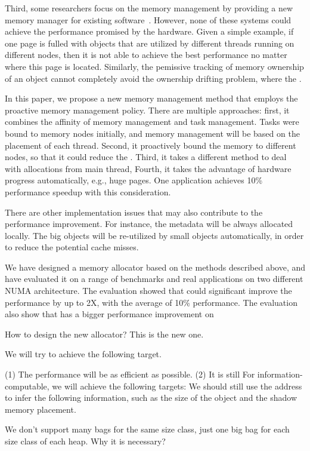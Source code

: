 Third, some researchers focus on the memory management by providing a new memory manager for existing software~\cite{}. 
However, none of these systems could achieve the performance promised by the hardware. Given a simple example, if one page is fulled with objects that are utilized by different threads running on different nodes, then it is not able to achieve the best performance no matter where this page is located. Similarly, the pemissive tracking of memory ownership of an object cannot completely avoid the ownership drifting problem, where the . 

In this paper, we propose a new memory management method that employs the proactive memory management policy. 
There are multiple approaches: first, it combines the affinity of memory management and task management. Tasks were bound to memory nodes initially, and memory management will be based on the placement of each thread. Second, it proactively bound the memory to different nodes, so that it could reduce the . Third, it takes a different method to deal with allocations from main thread, Fourth, it takes the advantage of hardware progress automatically, e.g., huge pages. One application achieves 10\% performance speedup with this consideration.  


There are other implementation issues that may also contribute to the performance improvement. For instance, the metadata will be always allocated locally. The big objects will be re-utilized by small objects automatically, in order to reduce the potential cache misses. 

We have designed a memory allocator based on the  methods described above, and have evaluated it on a range of benchmarks and real applications on two different NUMA architecture. The evaluation showed that \NA{} could significant improve the performance by up to 2X, with the average of 10\% performance. The evaluation also show that \NA{} has a bigger performance improvement on  


 
How to design the new allocator? This is the new one. 

We will try to achieve the following target. 

(1) The performance will be as efficient as possible. 
(2) It is still 
For information-computable, we will achieve the following targets:
We should still use the address to infer the following information, such as the size of the object and the shadow memory placement.

We don't support many bags for the same size class, just one big bag for each size class of each heap. Why it is necessary? 

